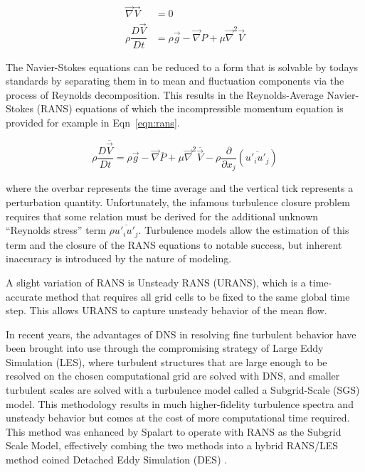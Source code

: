 \documentclass[journal]{new-aiaa}
\begin{document}
\begin{equation}
\label{eqn:navierstokes}
\begin{split}
\vec{\nabla}\vec{V} &= 0 \\
\rho \dfrac{D \vec{V}}{D t}
    &= \rho\vec{g} - \vec{\nabla} P + \mu \vec{\nabla}^2 \vec{V}
\end{split}
\end{equation}

The Navier-Stokes equations can be reduced to a form that is solvable by todays standards by separating them in to mean and fluctuation components via the process of Reynolds decomposition. This results in the Reynolds-Average Navier-Stokes (RANS) equations of which the incompressible momentum equation is provided for example in Eqn~\ref{eqn:rans}.



\begin{equation}
\label{eqn:rans}
\rho \dfrac{D \overline{\vec{V}}}{D t}
    = \rho\vec{g} - \vec{\nabla} \overline{P}
    + \mu \vec{\nabla}^2 \overline{\vec{V}}
    - \rho \dfrac{\partial}{\partial x_j} \left( \overline{u'_i u'_j} \right)
\end{equation}

\noindent where the overbar represents the time average and the vertical tick represents a perturbation quantity. Unfortunately, the infamous turbulence closure problem requires that some relation must be derived for the additional unknown ``Reynolds stress'' term $\rho \overline{u'_i u'_j}$. Turbulence models allow the estimation of this term and the closure of the RANS equations to notable success, but inherent inaccuracy is introduced by the nature of modeling.

A slight variation of RANS is Unsteady RANS (URANS), which is a time-accurate method that requires all grid cells to be fixed to the same global time step.  This allows URANS to capture unsteady behavior of the mean flow.

In recent years, the advantages of DNS in resolving fine turbulent behavior have been brought into use through the compromising strategy of Large Eddy Simulation (LES), where turbulent structures that are large enough to be resolved on the chosen computational grid are solved with DNS, and smaller turbulent scales are solved with a turbulence model called a Subgrid-Scale (SGS) model. This methodology results in much higher-fidelity turbulence spectra and unsteady behavior but comes at the cost of more computational time required. This method was enhanced by Spalart to operate with RANS as the Subgrid Scale Model, effectively combing the two methods into a hybrid RANS/LES method coined Detached Eddy Simulation (DES) \cite{spalart2009detachededdy}.
\end{document}
